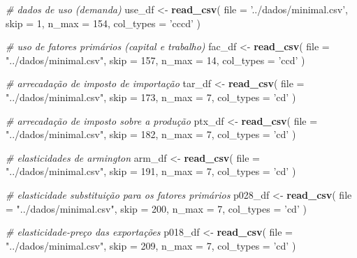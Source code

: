 \documentclass[12pt,twoside]{article}
\newenvironment{Shaded}{\begin{snugshade}}{\end{snugshade}}
\newcommand{\CommentTok}[1]{\textcolor[rgb]{0.56,0.35,0.01}{\textit{#1}}}
\newcommand{\DataTypeTok}[1]{\textcolor[rgb]{0.13,0.29,0.53}{#1}}
\newcommand{\DecValTok}[1]{\textcolor[rgb]{0.00,0.00,0.81}{#1}}
\newcommand{\KeywordTok}[1]{\textcolor[rgb]{0.13,0.29,0.53}{\textbf{#1}}}
\newcommand{\NormalTok}[1]{#1}
\newcommand{\StringTok}[1]{\textcolor[rgb]{0.31,0.60,0.02}{#1}}
\let\oldShaded\Shaded
\let\endoldShaded\endShaded
\renewenvironment{Shaded}{\footnotesize\oldShaded}{\endoldShaded}
\begin{document}
\begin{Shaded}
\begin{Highlighting}[]
\CommentTok{# dados de uso (demanda)}
\NormalTok{use_df <-}\StringTok{ }\KeywordTok{read_csv}\NormalTok{(}
  \DataTypeTok{file =} \StringTok{'../dados/minimal.csv'}\NormalTok{,}
  \DataTypeTok{skip =} \DecValTok{1}\NormalTok{,}
  \DataTypeTok{n_max =} \DecValTok{154}\NormalTok{,}
  \DataTypeTok{col_types =} \StringTok{'cccd'}
\NormalTok{)}

\CommentTok{# uso de fatores primários (capital e trabalho)}
\NormalTok{fac_df <-}\StringTok{ }\KeywordTok{read_csv}\NormalTok{(}
  \DataTypeTok{file =} \StringTok{"../dados/minimal.csv"}\NormalTok{,}
  \DataTypeTok{skip =} \DecValTok{157}\NormalTok{,}
  \DataTypeTok{n_max =} \DecValTok{14}\NormalTok{,}
  \DataTypeTok{col_types =} \StringTok{'ccd'}
\NormalTok{)}

\CommentTok{# arrecadação de imposto de importação}
\NormalTok{tar_df <-}\StringTok{ }\KeywordTok{read_csv}\NormalTok{(}
  \DataTypeTok{file =} \StringTok{"../dados/minimal.csv"}\NormalTok{,}
  \DataTypeTok{skip =} \DecValTok{173}\NormalTok{,}
  \DataTypeTok{n_max =} \DecValTok{7}\NormalTok{,}
  \DataTypeTok{col_types =} \StringTok{'cd'}
\NormalTok{)}

\CommentTok{# arrecadação de imposto sobre a produção}
\NormalTok{ptx_df <-}\StringTok{ }\KeywordTok{read_csv}\NormalTok{(}
  \DataTypeTok{file =} \StringTok{"../dados/minimal.csv"}\NormalTok{,}
  \DataTypeTok{skip =} \DecValTok{182}\NormalTok{,}
  \DataTypeTok{n_max =} \DecValTok{7}\NormalTok{,}
  \DataTypeTok{col_types =} \StringTok{'cd'}
\NormalTok{)}

\CommentTok{# elasticidades de armington}
\NormalTok{arm_df <-}\StringTok{ }\KeywordTok{read_csv}\NormalTok{(}
  \DataTypeTok{file =} \StringTok{"../dados/minimal.csv"}\NormalTok{,}
  \DataTypeTok{skip =} \DecValTok{191}\NormalTok{,}
  \DataTypeTok{n_max =} \DecValTok{7}\NormalTok{,}
  \DataTypeTok{col_types =} \StringTok{'cd'}
\NormalTok{)}

\CommentTok{# elasticidade substituição para os fatores primários}
\NormalTok{p028_df <-}\StringTok{ }\KeywordTok{read_csv}\NormalTok{(}
  \DataTypeTok{file =} \StringTok{"../dados/minimal.csv"}\NormalTok{,}
  \DataTypeTok{skip =} \DecValTok{200}\NormalTok{,}
  \DataTypeTok{n_max =} \DecValTok{7}\NormalTok{,}
  \DataTypeTok{col_types =} \StringTok{'cd'}
\NormalTok{)}

\CommentTok{# elasticidade-preço das exportações}
\NormalTok{p018_df <-}\StringTok{ }\KeywordTok{read_csv}\NormalTok{(}
  \DataTypeTok{file =} \StringTok{"../dados/minimal.csv"}\NormalTok{,}
  \DataTypeTok{skip =} \DecValTok{209}\NormalTok{,}
  \DataTypeTok{n_max =} \DecValTok{7}\NormalTok{,}
  \DataTypeTok{col_types =} \StringTok{'cd'}
\NormalTok{)}
\end{Highlighting}
\end{Shaded}
\end{document}
